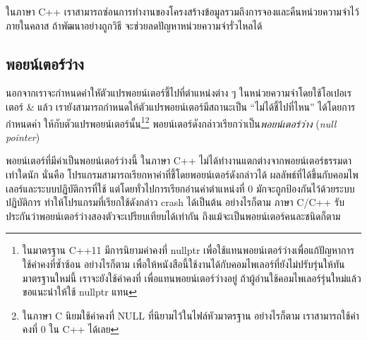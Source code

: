 ใน{\wbr}ภาษา C++
เรา{\wbr}สามารถ{\wbr}ซ่อน{\wbr}การ{\wbr}ทำงาน{\wbr}ของ{\wbr}โครงสร้าง{\wbr}ข้อมูล{\wbr}รวม{\wbr}ถึง{\wbr}การ{\wbr}จอง{\wbr}และ{\wbr}คืน{\wbr}หน่วยความจำ{\wbr}ไว้{\wbr}ภายใน{\wbr}ค{\wbr}ลา{\wbr}ส
ถ้า{\wbr}พัฒนา{\wbr}อย่าง{\wbr}ถูก{\wbr}วิธี จะ{\wbr}ช่วย{\wbr}ลด{\wbr}ปัญหา{\wbr}หน่วยความจำ{\wbr}รั่วไหล{\wbr}ได้{\wbr}

\subsection{พอยน์เตอร์{\wbr}ว่าง}
นอกจาก{\wbr}เรา{\wbr}จะ{\wbr}กำหนด{\wbr}ค่า{\wbr}ใหัตัว{\wbr}แปร{\wbr}พอยน์เตอร์{\wbr}ชี้{\wbr}ไป{\wbr}ที่{\wbr}ตำแหน่ง{\wbr}ต่าง ๆ
ใน{\wbr}หน่วยความจำ{\wbr}โดย{\wbr}ใช้{\wbr}โอ{\wbr}เปอเรเตอร์ {\ct\&} แล้ว{\wbr}
เรา{\wbr}ยัง{\wbr}สามารถ{\wbr}กำหนด{\wbr}ให้{\wbr}ตัวแปร{\wbr}พอยน์เตอร์{\wbr}มี{\wbr}สถานะ{\wbr}เป็น ``ไม่{\wbr}ได้{\wbr}ชี้{\wbr}ไป{\wbr}ที่ไหน''
ได้{\wbr}โดย{\wbr}การ{\wbr}กำหนด{\wbr}ค่า {} ให้{\wbr}กับ{\wbr}ตัวแปร{\wbr}พอยน์เตอร์{\wbr}นั้น\footnote{ใน{\wbr}มาตรฐาน C++11
  มี{\wbr}การ{\wbr}นิยาม{\wbr}ค่าคงที่ {\ct nullptr}
  เพื่อ{\wbr}ใช้{\wbr}แทน{\wbr}พอยน์เตอร์{\wbr}ว่าง{\wbr}เพื่อ{\wbr}แก้{\wbr}ปัญหา{\wbr}การ{\wbr}ใช้{\wbr}ค่าคงที่{\wbr}ซ้ำซ้อน อย่างไรก็ตาม{\wbr}
  เพื่อให้{\wbr}หนังสือ{\wbr}นี้{\wbr}ใช้{\wbr}งาน{\wbr}ได้{\wbr}กับ{\wbr}คอม{\wbr}ไพ{\wbr}เลอร์{\wbr}ที่{\wbr}ยัง{\wbr}ไม่{\wbr}ปรับ{\wbr}รุ่น{\wbr}ให้{\wbr}ทัน{\wbr}มาตรฐาน{\wbr}ใหม่{\wbr}นี้{\wbr}
  เรา{\wbr}จะ{\wbr}ยัง{\wbr}ใช้{\wbr}ค่าคงที่ {} เพื่อ{\wbr}แทน{\wbr}พอยน์เตอร์{\wbr}ว่าง{\wbr}อยู่ ถ้า{\wbr}ผู้อ่าน{\wbr}ใช้{\wbr}คอม{\wbr}ไพ{\wbr}เลอร์{\wbr}รุ่น{\wbr}ใหม่{\wbr}แล้ว{\wbr}
  ขอ{\wbr}แนะนำ{\wbr}ให้{\wbr}ใช้ {\ct nullptr} แทน {}}\footnote{ใน{\wbr}ภาษา C นิยม{\wbr}ใช้{\wbr}ค่าคงที่{\wbr}
  {\ct NULL} ที่{\wbr}นิยาม{\wbr}ไว้{\wbr}ใน{\wbr}ไฟล์{\wbr}หัว{\wbr}มาตรฐาน อย่างไรก็ตาม เรา{\wbr}สามารถ{\wbr}ใช้{\wbr}ค่าคงที่ 0 ใน{\wbr}
  C++ ได้{\wbr}เลย} พอยน์เตอร์ดังกล่าว{\wbr}เรียก{\wbr}ว่า{\wbr}เป็น{\em พอยน์เตอร์ว่าง} ({\em null
  pointer})

พอยน์เตอร์ที่{\wbr}มี{\wbr}ค่า{\wbr}เป็น{\wbr}พอยน์เตอร์{\wbr}ว่าง{\wbr}นี้ ใน{\wbr}ภาษา C++
ไม่{\wbr}ได้{\wbr}ทำงาน{\wbr}แตกต่าง{\wbr}จาก{\wbr}พอยน์เตอร์{\wbr}ธรรมดา{\wbr}เท่าใด{\wbr}นัก นั่น{\wbr}คือ{\wbr}
โปรแกรม{\wbr}สามารถ{\wbr}เรียกหา{\wbr}ค่า{\wbr}ที่{\wbr}ชี้{\wbr}โดย{\wbr}พอยน์เตอร์{\wbr}ดังกล่าว{\wbr}ได้{\wbr}
ผลลัพธ์{\wbr}ที่{\wbr}ได้{\wbr}ขึ้น{\wbr}กับ{\wbr}คอม{\wbr}ไพ{\wbr}เลอร์{\wbr}และ{\wbr}ระบบปฏิบัติการ{\wbr}ที่{\wbr}ใช้ แต่{\wbr}โดย{\wbr}ทั่วไป{\wbr}การ{\wbr}เรียก{\wbr}อ่าน{\wbr}ค่า{\wbr}ตำแหน่ง{\wbr}ที่ 0
มักจะ{\wbr}ถูก{\wbr}ป้องกัน{\wbr}ไว้{\wbr}ด้วย{\wbr}ระบบปฏิบัติการ ทำ{\wbr}ให้{\wbr}โปรแกรม{\wbr}ที่{\wbr}เรียก{\wbr}ใช้{\wbr}ดังกล่าว crash ได้{\wbr}เป็นต้น{\wbr}
อย่างไรก็ตาม ภาษา C/C++ รับประกัน{\wbr}ว่า{\wbr}พอยน์เตอร์{\wbr}ว่าง{\wbr}สอง{\wbr}ตัว{\wbr}จะ{\wbr}เปรียบเทียบ{\wbr}ได้{\wbr}เท่า{\wbr}กัน{\wbr}
ถึงแม้{\wbr}จะ{\wbr}เป็น{\wbr}พอยน์เตอร์{\wbr}คน{\wbr}ละ{\wbr}ชนิด{\wbr}ก็ตาม{\wbr}

